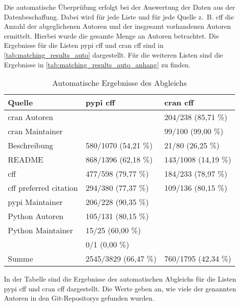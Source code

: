 Die automatische Überprüfung erfolgt bei der Auswertung der Daten aus der Datenbeschaffung.
Dabei wird für jede Liste und für jede Quelle z.~B. \gls{cff} die Anzahl der abgeglichenen Autoren und der insgesamt vorhandenen Autoren ermittelt.
Hierbei wurde die gesamte Menge an Autoren betrachtet.
Die Ergebnisse für die Listen \gls{pypi} \gls{cff} und \gls{cran} \gls{cff} sind in \autoref{tab:matching_results_auto} dargestellt.
Für die weiteren Listen sind die Ergebnisse in \autoref{tab:matching_results_auto_anhang} zu finden.

\begin{table}
    \begin{tabularx}{\textwidth}{XR{3.8cm}R{3.8cm}}
        \toprule
        \textbf{Quelle}              & \textbf{\gls{pypi} \gls{cff}} & \textbf{\gls{cran} \gls{cff}} \\ \midrule
        \gls{cran} Autoren           &                               & 204/238 (85,71 \%)            \\
        \gls{cran} Maintainer        &                               & 99/100 (99,00 \%)             \\
        Beschreibung                 & 580/1070 (54,21 \%)           & 21/80 (26,25 \%)              \\
        README                       & 868/1396 (62,18 \%)           & 143/1008 (14,19 \%)           \\
        \gls{cff}                    & 477/598 (79,77 \%)            & 184/233 (78,97 \%)            \\
        \gls{cff} preferred citation & 294/380 (77,37 \%)            & 109/136 (80,15 \%)            \\
        \gls{pypi} Maintainer        & 206/228 (90,35 \%)            &                               \\
        Python Autoren               & 105/131 (80,15 \%)            &                               \\
        Python Maintainer            & 15/25 (60,00 \%)              &                               \\
                      & 0/1 (0,00 \%)                 &                               \\ \midrule
        Summe                        & 2545/3829 (66,47 \%)          & 760/1795 (42,34 \%)           \\
        \bottomrule
    \end{tabularx}
    \caption{Automatische Ergebnisse des Abgleichs}
    \label{tab:matching_results_auto}
    \small
    In der Tabelle sind die Ergebnisse des automatischen Abgleichs für die Listen \gls{pypi} \gls{cff} und \gls{cran} \gls{cff} dargestellt. Die Werte geben an, wie viele der genannten Autoren in den Git-Repositorys gefunden wurden.
\end{table}

